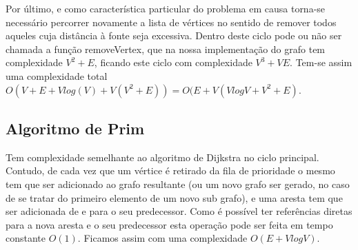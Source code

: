\documentclass[a4paper,12pt,titlepage]{article}
\begin{document}
Por último, e como característica particular do problema em causa torna-se necessário percorrer novamente a lista de vértices no sentido de remover todos aqueles cuja distância à fonte seja excessiva. Dentro deste ciclo pode ou não ser chamada a função removeVertex, que na nossa implementação do grafo tem complexidade $V^2+ E$, ficando este ciclo com complexidade $V^3+VE$. Tem-se assim uma complexidade total $O(V+E+Vlog(V)+V(V^2+E)) = O(E+V(VlogV+V^2+E)$.
\subsection{Algoritmo de Prim}
Tem complexidade semelhante ao algoritmo de Dijkstra no ciclo principal. Contudo, de cada vez que um vértice é retirado da fila de prioridade o mesmo tem que ser adicionado ao grafo resultante (ou um novo grafo ser gerado, no caso de se tratar do primeiro elemento de um novo sub grafo), e uma aresta tem que ser adicionada de e para o seu predecessor. Como é possível ter referências diretas para a nova aresta e o seu predecessor esta operação pode ser feita em tempo constante $O(1)$. Ficamos assim com uma complexidade $O(E+VlogV)$.

\newpage


\end{document}
